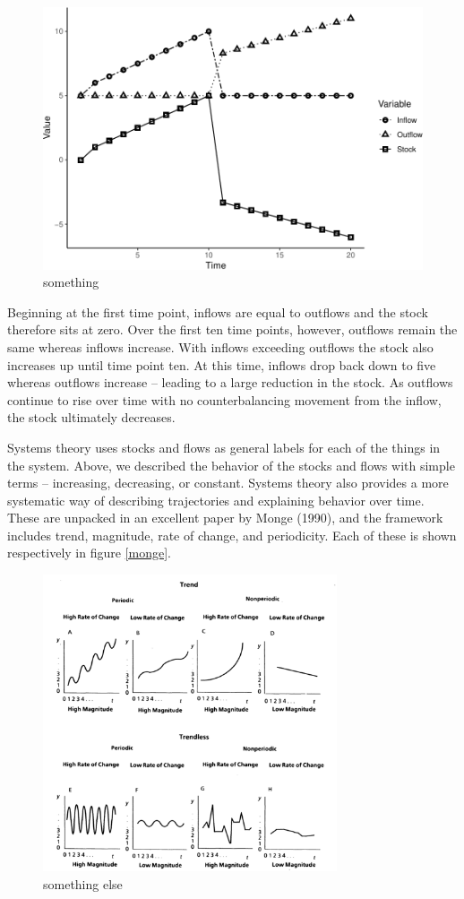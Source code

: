 \documentclass[english,,man]{apa6}
\theoremstyle{definition}
\theoremstyle{definition}
\theoremstyle{definition}
\theoremstyle{remark}
\begin{document}
\begin{figure}
\centering
\includegraphics{compile_cp_files/figure-latex/unnamed-chunk-4-1.pdf}
\caption{\label{fig:unnamed-chunk-4}something\label{stocks}}
\end{figure}

\noindent Beginning at the first time point, inflows are equal to
outflows and the stock therefore sits at zero. Over the first ten time
points, however, outflows remain the same whereas inflows increase. With
inflows exceeding outflows the stock also increases up until time point
ten. At this time, inflows drop back down to five whereas outflows
increase -- leading to a large reduction in the stock. As outflows
continue to rise over time with no counterbalancing movement from the
inflow, the stock ultimately decreases.

Systems theory uses stocks and flows as general labels for each of the
things in the system. Above, we described the behavior of the stocks and
flows with simple terms -- increasing, decreasing, or constant. Systems
theory also provides a more systematic way of describing trajectories
and explaining behavior over time. These are unpacked in an excellent
paper by Monge (1990), and the framework includes trend, magnitude, rate
of change, and periodicity. Each of these is shown respectively in
figure \ref{monge}.

\begin{figure}
\includegraphics[width=3.42in]{figs/fig_monge1} \caption{something else\label{monge}}\label{fig:unnamed-chunk-5}
\end{figure}
\end{document}
